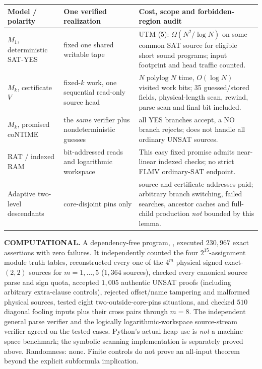 \documentclass[11pt]{article}
\begin{document}
\begin{center}\small
\begin{tabularx}{.98\linewidth}{p{.16\linewidth}p{.30\linewidth}X}
\toprule
Model / polarity & One verified realization & Cost, scope and forbidden-region audit\\\midrule
$M_1$, deterministic SAT-YES & fixed one shared writable tape & UTM (5): $\Omega(N^2/\log N)$ on some common SAT source for eligible short sound programs; input footprint and head traffic counted.\\
$M_k$, certificate $V$ & fixed-$k$ work, one sequential read-only source head & $N\operatorname{polylog}N$ time, $O(\log N)$ visited work bits; 35 guessed/stored fields, physical-length scan, rewind, parse scan and final bit included.\\
$M_k$, promised coNTIME & the \emph{same} verifier plus nondeterministic guesses & all YES branches accept, a NO branch rejects; does not handle all ordinary UNSAT sources.\\
RAT / indexed RAM & bit-addressed reads and logarithmic workspace & This easy fixed promise admits near-linear indexed checks; no strict FLMV ordinary-SAT endpoint.\\
Adaptive two-level descendants & core-disjoint pins only & source and certificate addresses paid; arbitrary branch switching, failed searches, ancestor caches and full-child production \emph{not} bounded by this lemma.\\\bottomrule
\end{tabularx}
\end{center}

\textbf{COMPUTATIONAL.} A dependency-free program, , executed $230{,}967$ exact assertions with zero failures. It independently counted the four $2^{15}$-assignment module truth tables, reconstructed every one of the $4^m$ physical signed exact-$(2,2)$ sources for $m=1,\ldots,5$ ($1{,}364$ sources), checked every canonical source parse and sign quota, accepted $1{,}005$ authentic UNSAT proofs (including arbitrary extra-clause controls), rejected offset/name tampering and malformed physical sources, tested eight two-outside-core-pins situations, and checked $510$ diagonal fooling inputs plus their cross pairs through $m=8$. The independent general parse verifier and the logically logarithmic-workspace source-stream verifier agreed on the tested cases. Python's actual heap use is \emph{not} a machine-space benchmark; the symbolic scanning implementation is separately proved above. Randomness: none. Finite controls do not prove an all-input theorem beyond the explicit subformula implication.
\end{document}

